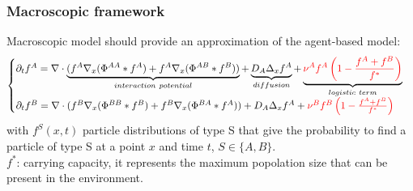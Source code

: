 \documentclass[10pt]{beamer}
\def \p {{\partial}}
\newcommand\Fontvii{\fontsize{9}{7.2}\selectfont}
\begin{document}
\begin{frame}
\frametitle{Macroscopic framework}
\Fontvii
Macroscopic model should provide an approximation of the agent-based model:
	\begin{equation}
\begin{cases}
\p_t f^{A}=  \nabla \cdot \underbrace{(f^A\nabla_x(\Phi^{AA}* f^A) + f^A \nabla_x( \Phi^{AB}*f^B))}_{interaction \ potential} + \underbrace{ D_A \Delta_x f^A}_{diffusion} + \underbrace{ \textcolor{red}{\nu^{A}f^A\left( 1-\frac{f^A+f^B}{f^{*}} \right)}}_{logistic \ term} \\

\p_t f^{B}=  \nabla \cdot (f^B\nabla_x(\Phi^{BB}* f^B) + f^B \nabla_x (\Phi^{BA}*f^A)) + D_A \Delta_x f^A + \textcolor{red}{\nu^{B}f^B\left( 1-\frac{f^A+f^B}{f^{*}} \right)}
\end{cases}
\end{equation}
with  $f^{S}(x,t)$ particle distributions of type S that give the probability to find a particle of type S at a point $x$ and time $t$, $S \in \{ A,B \}$. \\
 $f^*$: carrying capacity, it represents the maximum popolation size that can be present in the environment.

\end{frame}
\end{document}
